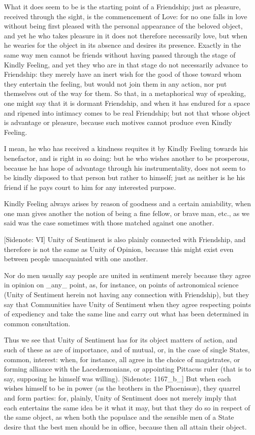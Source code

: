 What it does seem to be is the starting point of a Friendship; just as
pleasure, received through the sight, is the commencement of Love: for
no one falls in love without being first pleased with the personal
appearance of the beloved object, and yet he who takes pleasure in it
does not therefore necessarily love, but when he wearies for the object
in its absence and desires its presence. Exactly in the same way men
cannot be friends without having passed through the stage of Kindly
Feeling, and yet they who are in that stage do not necessarily advance
to Friendship: they merely have an inert wish for the good of those
toward whom they entertain the feeling, but would not join them in
any action, nor put themselves out of the way for them. So that, in
a metaphorical way of speaking, one might say that it is dormant
Friendship, and when it has endured for a space and ripened into
intimacy comes to be real Friendship; but not that whose object is
advantage or pleasure, because such motives cannot produce even Kindly
Feeling.

I mean, he who has received a kindness requites it by Kindly Feeling
towards his benefactor, and is right in so doing: but he who wishes
another to be prosperous, because he has hope of advantage through his
instrumentality, does not seem to be kindly disposed to that person but
rather to himself; just as neither is he his friend if he pays court to
him for any interested purpose.

Kindly Feeling always arises by reason of goodness and a certain
amiability, when one man gives another the notion of being a fine
fellow, or brave man, etc., as we said was the case sometimes with those
matched against one another.

[Sidenote: VI] Unity of Sentiment is also plainly connected with
Friendship, and therefore is not the same as Unity of Opinion,
because this might exist even between people unacquainted with one
another.

Nor do men usually say people are united in sentiment merely because
they agree in opinion on _any_ point, as, for instance, on points
of astronomical science (Unity of Sentiment herein not having any
connection with Friendship), but they say that Communities have Unity of
Sentiment when they agree respecting points of expediency and take the
same line and carry out what has been determined in common consultation.

Thus we see that Unity of Sentiment has for its object matters of
action, and such of these as are of importance, and of mutual, or, in
the case of single States, common, interest: when, for instance, all
agree in the choice of magistrates, or forming alliance with the
Lacedæmonians, or appointing Pittacus ruler (that is to say, supposing
he himself was willing). [Sidenote: 1167_b_] But when each wishes
himself to be in power (as the brothers in the Phoenissæ), they quarrel
and form parties: for, plainly, Unity of Sentiment does not merely imply
that each entertains the same idea be it what it may, but that they do
so in respect of the same object, as when both the populace and the
sensible men of a State desire that the best men should be in office,
because then all attain their object.

